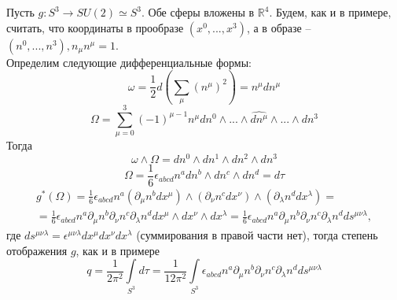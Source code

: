 \documentclass[12pt]{article}
\theoremstyle{definition}
\begin{document}
Пусть $g:S^3\rightarrow SU(2)\simeq S^3$. Обе сферы вложены в $\mathbb{R}^4$. Будем, как и в примере, считать, что координаты в прообразе $(x^0,...,x^3)$, а в образе -- $(n^0,...,n^3),n_\mu n^\mu=1$.\\
Определим следующие дифференциальные формы:
\begin{equation}
    \omega=\frac{1}{2}d\left(\sum\limits_\mu(n^\mu)^2\right)=n^\mu dn^\mu
\end{equation}
\begin{equation}
    \Omega=\sum\limits_{\mu=0}^3(-1)^{\mu-1}n^\mu dn^0\wedge...\wedge\widehat{dn^\mu}\wedge...\wedge dn^3
\end{equation}
Тогда
\begin{equation}\label{eq22}
    \omega\wedge\Omega=dn^0\wedge dn^1\wedge dn^2\wedge dn^3
\end{equation}
\begin{equation}
    \Omega=\frac{1}{6}\epsilon_{abcd}n^adn^b\wedge dn^c\wedge dn^d=d\tau
\end{equation}
\begin{multline}
    g^*(\Omega)=\frac{1}{6}\epsilon_{abcd}n^a(\partial_\mu n^bdx^\mu)\wedge(\partial_\nu n^cdx^\nu)\wedge(\partial_\lambda n^ddx^\lambda)=\\=\frac{1}{6}\epsilon_{abcd}n^a\partial_\mu n^b\partial_\nu n^c\partial_\lambda n^ddx^\mu\wedge dx^\nu\wedge dx^\lambda=\frac{1}{6}\epsilon_{abcd}n^a\partial_\mu n^b\partial_\nu n^c\partial_\lambda n^dds^{\mu\nu\lambda},
\end{multline}
где $ds^{\mu\nu\lambda}=\epsilon^{\mu\nu\lambda}dx^\mu dx^\nu dx^\lambda$ (суммирования в правой части нет), тогда степень отображения $g$, как и в примере
\begin{equation}
    q=\frac{1}{2\pi^2}\int\limits_{S^3}d\tau=\frac{1}{12\pi^2}\int\limits_{S^3}\epsilon_{abcd}n^a\partial_\mu n^b\partial_\nu n^c\partial_\lambda n^dds^{\mu\nu\lambda}
\end{equation}
\end{document}
